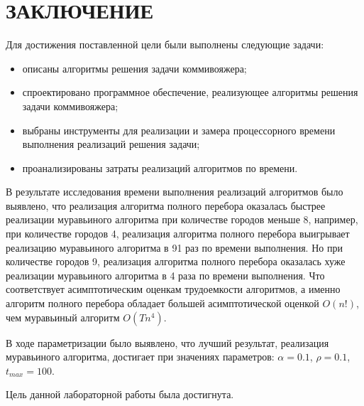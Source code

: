 \chapter*{ЗАКЛЮЧЕНИЕ}

Для достижения поставленной цели были выполнены следующие задачи:
\begin{itemize}
	\item описаны алгоритмы решения задачи коммивояжера;
	\item спроектировано программное обеспечение, реализующее алгоритмы решения задачи коммивояжера;
	\item выбраны инструменты для реализации и замера процессорного времени
	выполнения реализаций решения задачи;
	\item проанализированы затраты реализаций алгоритмов по времени.
\end{itemize}

В результате исследования времени выполнения реализаций алгоритмов было выявлено, что реализация алгоритма полного перебора оказалась быстрее реализации муравьиного алгоритма при количестве городов меньше 8, например, при количестве городов 4, реализация алгоритма полного перебора выигрывает реализацию муравьиного алгоритма в 91 раз по времени выполнения. 
Но при количестве городов 9, реализация алгоритма полного перебора оказалась хуже реализации муравьиного алгоритма в 4 раза по времени выполнения.
Что соответствует асимптотическим оценкам трудоемкости алгоритмов, а именно алгоритм полного перебора обладает большей асимптотической оценкой $O(n!)$, чем муравьиный алгоритм $O(Tn^4)$.

В ходе параметризации было выявлено, что лучший результат, реализация муравьиного алгоритма, достигает при значениях параметров: $\alpha = 0.1$, $\rho = 0.1$, $t_{max} = 100$.

Цель данной лабораторной работы была достигнута.